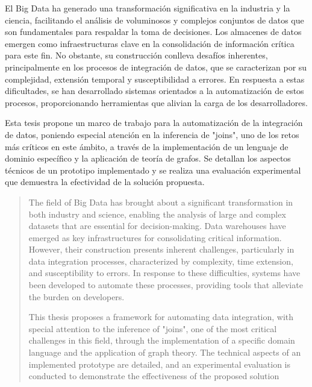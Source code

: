 \begin{resumen}
El Big Data ha generado una transformación significativa en la industria y la ciencia, facilitando el 
análisis de voluminosos y complejos conjuntos de datos que son fundamentales para respaldar la toma de 
decisiones. Los almacenes de datos emergen como infraestructuras clave en la consolidación de información 
crítica para este fin. No obstante, su construcción conlleva desafíos inherentes, principalmente en los 
procesos de integración de datos, que se caracterizan por su complejidad, extensión temporal y susceptibilidad 
a errores. En respuesta a estas dificultades, se han desarrollado sistemas orientados a la automatización de 
estos procesos, proporcionando herramientas que alivian la carga de los desarrolladores.

Esta tesis propone un marco de trabajo para la automatización de la integración de datos, poniendo 
especial atención en la inferencia de "joins", uno de los retos más críticos en este ámbito, a través de la 
implementación de un lenguaje de dominio específico y la aplicación de teoría de grafos. Se detallan los aspectos 
técnicos de un prototipo implementado y se realiza una evaluación experimental que demuestra la efectividad de la 
solución propuesta.
\end{resumen}

\begin{abstract}
The field of Big Data has brought about a significant transformation in both industry and science, enabling the 
analysis of large and complex datasets that are essential for decision-making. Data warehouses have emerged as 
key infrastructures for consolidating critical information. However, their construction presents inherent 
challenges, particularly in data integration processes, characterized by complexity, time extension, and 
susceptibility to errors. In response to these difficulties, systems have been developed to automate these 
processes, providing tools that alleviate the burden on developers.

This thesis proposes a framework for automating data integration, with special attention to the inference of "joins", 
one of the most critical challenges in this field, through the implementation of a specific domain language and the 
application of graph theory. The technical aspects of an implemented prototype are detailed, and an experimental 
evaluation is conducted to demonstrate the effectiveness of the proposed solution
\end{abstract}